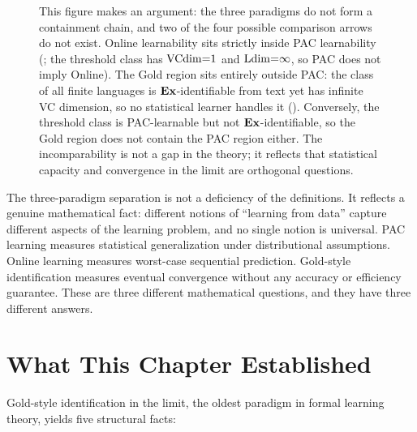 \begin{figure}[ht]
\caption[The three paradigms: online strictly inside PAC, Gold incomparable to both]{This figure makes an argument: the three paradigms do not form a containment chain, and two of the four possible comparison arrows do not exist. Online learnability sits strictly inside PAC learnability (; the threshold class has $\mathrm{VCdim}{=}1$ and $\mathrm{Ldim}{=}\infty$, so PAC does not imply Online). The Gold region sits entirely outside PAC: the class of all finite languages is $\mathbf{Ex}$-identifiable from text yet has infinite VC dimension, so no statistical learner handles it (). Conversely, the threshold class is PAC-learnable but not $\mathbf{Ex}$-identifiable, so the Gold region does not contain the PAC region either. The incomparability is not a gap in the theory; it reflects that statistical capacity and convergence in the limit are orthogonal questions.}
\label{fig:three-paradigm}
\end{figure}

\begin{remark}
\label{rmk:separation-meaning}
The three-paradigm separation is not a deficiency of the definitions. It reflects a genuine mathematical fact: different notions of ``learning from data'' capture different aspects of the learning problem, and no single notion is universal. PAC learning measures statistical generalization under distributional assumptions. Online learning measures worst-case sequential prediction. Gold-style identification measures eventual convergence without any accuracy or efficiency guarantee. These are three different mathematical questions, and they have three different answers.
\end{remark}


\section{What This Chapter Established}
\label{sec:ch7-summary}

Gold-style identification in the limit, the oldest paradigm in formal learning theory, yields five structural facts:

